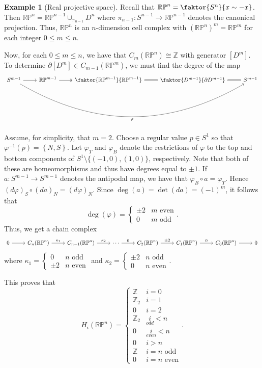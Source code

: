 \documentclass[10pt,letterpaper,cm]{nupset}
\theoremstyle{definition}
\newtheorem{exmp}[defn]{Example}
\theoremstyle{theorem}
\theoremstyle{remark}
\newcommand{\RP}{\mathbb{RP}}
\newcommand{\Z}{\mathbb Z}
\newcommand{\1}{\mathbb{1}}
\newcommand{\0}{\vec 0}
\begin{document}
\begin{exmp}[Real projective space]
Recall that $\RP^n = \faktor{S^n}{x \sim {-}x}$. Then $\RP^n = \RP^{n-1} \cup_{\pi_{n-1}} D^n$ where $\pi_{n-1} : S^{n-1} \to \RP^{n-1}$ denotes the canonical projection. Thus, $\RP^n$ is an $n$-dimension cell complex with $\left(\RP^n\right)^m = \RP^m$ for each integer $0\leq m\leq n$.

\medskip

Now, for each $0\leq m \leq n$, we have that $C_m(\RP^n) \cong \Z$ with generator $\left[D^m\right]$. To determine $\partial[D^m]\in C_{m-1}(\RP^m)$, we must find the degree of the map
\[
\begin{tikzcd}
S^{m-1} \arrow[rrrr, "\varphi"', bend right] \arrow[r] & \RP^{m-1} \arrow[r, two heads] & \faktor{\RP^{m-1}}{\RP^{m-1}} \arrow[r, equals] & \faktor{D^{m-1}}{\partial{D^{m-1}}} \arrow[r, equals] & S^{m-1}
\end{tikzcd}
\]
Assume, for simplicity, that $m=2$. Choose a regular value $p\in S^{1}$ so that $\varphi^{-1}(p) = \left\{N, S\right\}$. Let $\varphi_T$ and $\varphi_B$ denote the restrictions of $\varphi$ to the top and bottom components of $S^1 \setminus \{({-1}, 0), (1,0)\}$, respectively. Note that both of these are homeomorphisms and thus have degrees equal to $\pm 1$. If $a: S^{m-1} \to S^{m-1}$ denotes the antipodal map, we have that $\varphi_B \circ a= \varphi_T$. Hence $\left(d{\varphi}\right)_S \circ (d{a})_N = \left(d{\varphi}\right)_N$.  Since $\deg(a) = \det(d{a}) = \left({-1}\right)^m$, it follows that $$\deg(\varphi) = \begin{cases} \pm 2 & m  \text{ even} \\ 0 & m \text{ odd} \end{cases}.$$
Thus, we get a chain complex
\[
\begin{tikzcd}
0 \arrow[r] & C_n(\RP^n) \arrow[r, "\kappa_1"] & C_{n-1}(\RP^n) \arrow[r, "\kappa_2"] & \cdots \arrow[r, "0"] & C_2(\RP^n) \arrow[r, "\pm 2"] & C_1(\RP^n) \arrow[r, "0"] & C_0(\RP^n) \arrow[r] & 0
\end{tikzcd}
\] where $\kappa_1 = \begin{cases} 0 & n \text{ odd} \\ \pm 2 & n \text{ even} \end{cases}$ and $\kappa_2 = \begin{cases} \pm 2 & n \text{ odd} \\ 0 & n \text{ even} \end{cases}$.

This proves that $$ H_i( \RP^n) = \begin{cases} \Z & i =0 \\ \Z_2 & i =1 \\ 0 & i =2 \\ \Z_2 & \underset{odd}{i} <n \\ 0 & \underset{even}{i} <n \\ 0 & i >n \\ \Z & i =n \text{ odd} \\ 0 & i= n \text{ even}    \end{cases}  .$$
\end{exmp}
\end{document}
